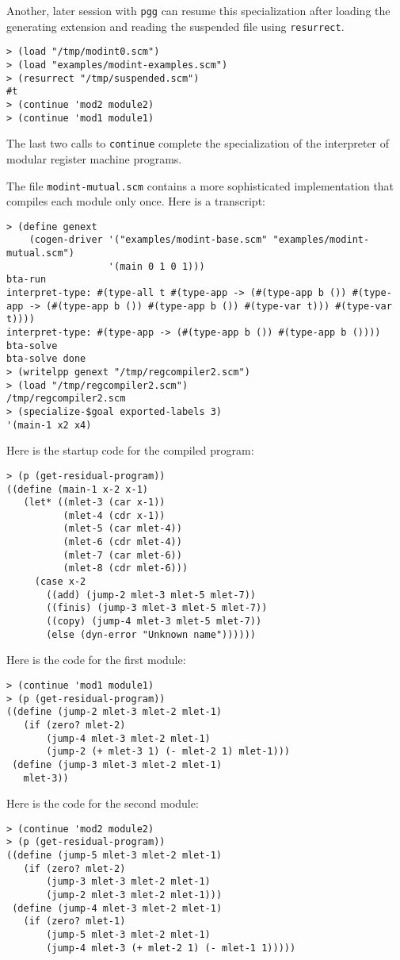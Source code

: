 \documentclass[11pt]{article}
\makeatletter
\newcommand{\indextt}[1]{\index{#1@\texttt{#1}}}
\makeatother
\begin{document}
Another, later session with \texttt{pgg} can resume this specialization after
loading the generating extension and reading the suspended file using
\texttt{resurrect}.\indextt{resurrect} 
\begin{verbatim}
> (load "/tmp/modint0.scm")
> (load "examples/modint-examples.scm")
> (resurrect "/tmp/suspended.scm")
#t
> (continue 'mod2 module2)
> (continue 'mod1 module1)
\end{verbatim}

The last two calls to \texttt{continue} complete the specialization of the
interpreter of modular register machine programs.

The file \texttt{modint-mutual.scm} contains a more sophisticated
implementation that compiles each module only once. Here is a transcript:
\begin{verbatim}
> (define genext
    (cogen-driver '("examples/modint-base.scm" "examples/modint-mutual.scm")
                  '(main 0 1 0 1)))
bta-run
interpret-type: #(type-all t #(type-app -> (#(type-app b ()) #(type-app -> (#(type-app b ()) #(type-app b ()) #(type-var t))) #(type-var t))))
interpret-type: #(type-app -> (#(type-app b ()) #(type-app b ())))
bta-solve
bta-solve done
> (writelpp genext "/tmp/regcompiler2.scm")
> (load "/tmp/regcompiler2.scm")
/tmp/regcompiler2.scm
> (specialize-$goal exported-labels 3)
'(main-1 x2 x4)
\end{verbatim}
Here is the startup code for the compiled program:
\begin{verbatim}
> (p (get-residual-program))
((define (main-1 x-2 x-1)
   (let* ((mlet-3 (car x-1))
          (mlet-4 (cdr x-1))
          (mlet-5 (car mlet-4))
          (mlet-6 (cdr mlet-4))
          (mlet-7 (car mlet-6))
          (mlet-8 (cdr mlet-6)))
     (case x-2
       ((add) (jump-2 mlet-3 mlet-5 mlet-7))
       ((finis) (jump-3 mlet-3 mlet-5 mlet-7))
       ((copy) (jump-4 mlet-3 mlet-5 mlet-7))
       (else (dyn-error "Unknown name"))))))
\end{verbatim}
Here is the code for the first module:
\begin{verbatim}
> (continue 'mod1 module1)
> (p (get-residual-program))
((define (jump-2 mlet-3 mlet-2 mlet-1)
   (if (zero? mlet-2)
       (jump-4 mlet-3 mlet-2 mlet-1)
       (jump-2 (+ mlet-3 1) (- mlet-2 1) mlet-1)))
 (define (jump-3 mlet-3 mlet-2 mlet-1)
   mlet-3))
\end{verbatim}
Here is the code for the second module:
\begin{verbatim}
> (continue 'mod2 module2)
> (p (get-residual-program))
((define (jump-5 mlet-3 mlet-2 mlet-1)
   (if (zero? mlet-2)
       (jump-3 mlet-3 mlet-2 mlet-1)
       (jump-2 mlet-3 mlet-2 mlet-1)))
 (define (jump-4 mlet-3 mlet-2 mlet-1)
   (if (zero? mlet-1)
       (jump-5 mlet-3 mlet-2 mlet-1)
       (jump-4 mlet-3 (+ mlet-2 1) (- mlet-1 1)))))
\end{verbatim}
\end{document}
